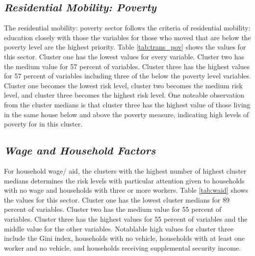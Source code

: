 


\subsection{\textit{Residential Mobility: Poverty}}

The residential mobility: poverty sector follows the criteria of residential mobility: education closely with those the variables for those who moved that are below the poverty level are the highest priority. Table \ref{tab:trans_pov} shows the values for this sector. Cluster one has the lowest values for every variable. Cluster two has the medium value for 57 percent of variables. Cluster three has the highest values for 57 percent of variables including three of the below the poverty level variables. Cluster one becomes the lowest risk level, cluster two becomes the medium risk level, and cluster three becomes the highest risk level. One noteable observation from the cluster medians is that cluster three has the highest value of those living in the same house below and above the poverty measure, indicating high levels of poverty for \cts in this cluster.



\subsection{\textit{Wage and Household Factors}}

For household wage/ aid, the clusters with the highest number of highest cluster medians determines the risk levels with particular attention given to households with no wage and households with three or more workers. Table \ref{tab:waid} shows the values for this sector. Cluster one has the lowest cluster medians for 89 percent of variables. Cluster two has the medium value for 55 percent of variables. Cluster three has the highest values for 55 percent of variables and the middle value for the other variables. Notablable high values for cluster three include the Gini index, households with no vehicle, households with at least one worker and no vehicle, and households receiving supplemental security income.  



